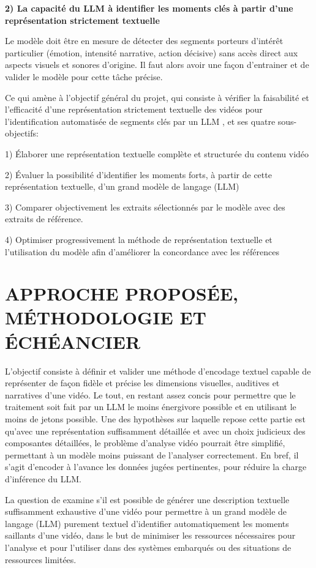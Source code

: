 \documentclass[livre]{udes-genie-these}
\begin{document}
\textbf{2) La capacité du LLM à identifier les moments clés à partir d'une représentation strictement textuelle}

Le modèle doit être en mesure de détecter des segments porteurs d'intérêt particulier (émotion, intensité narrative, action décisive) sans accès direct aux aspects visuels et sonores d'origine. Il faut alors avoir une façon d’entrainer et de valider le modèle pour cette tâche précise.


Ce qui amène à l'objectif général du projet, qui consiste à vérifier la faisabilité et l'efficacité d'une représentation strictement textuelle des vidéos pour l'identification automatisée de segments clés par un LLM , et ses quatre sous-objectifs:

1) Élaborer une représentation textuelle complète et structurée du contenu vidéo

2) Évaluer la possibilité d’identifier les moments forts, à partir de cette représentation textuelle, d'un grand modèle de langage (LLM)

3) Comparer objectivement les extraits sélectionnés par le modèle avec des extraits de référence.

4) Optimiser progressivement la méthode de représentation textuelle et l'utilisation du modèle afin d'améliorer la concordance avec les références



\chapter{APPROCHE PROPOSÉE, MÉTHODOLOGIE ET ÉCHÉANCIER}

L'objectif consiste à définir et valider une méthode d'encodage textuel capable de représenter de façon fidèle et précise les dimensions visuelles, auditives et narratives d'une vidéo. Le tout, en restant assez concis pour permettre que le traitement soit fait par un LLM le moins énergivore possible et en utilisant le moins de jetons possible. Une des hypothèses sur laquelle repose cette partie est qu'avec une représentation suffisamment détaillée et avec un choix judicieux des composantes détaillées, le problème d'analyse vidéo pourrait être simplifié, permettant à un modèle moins puissant de l'analyser correctement. En bref, il s’agit d’encoder à l’avance les données jugées pertinentes, pour réduire la charge d’inférence du LLM.

La question de examine s'il est possible de générer une description textuelle suffisamment exhaustive d'une vidéo pour permettre à un grand modèle de langage (LLM) purement textuel d'identifier automatiquement les moments saillants d'une vidéo, dans le but de minimiser les ressources nécessaires pour l'analyse et pour l'utiliser dans des systèmes embarqués ou des situations de ressources limitées.
\end{document}
